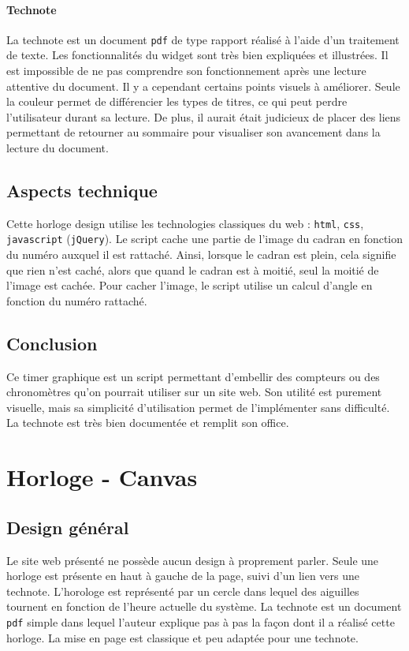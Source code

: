\documentclass[a4paper,11pt]{article}
\begin{document}
\paragraph{Technote}La technote est un document \texttt{pdf} de type rapport réalisé à l'aide d'un traitement de texte. Les fonctionnalités du widget sont très bien expliquées et illustrées. Il est impossible de ne pas comprendre son fonctionnement après une lecture attentive du document. Il y a cependant certains points visuels à améliorer. Seule la couleur permet de différencier les types de titres, ce qui peut perdre l'utilisateur durant sa lecture. De plus, il aurait était judicieux de placer des liens permettant de retourner au sommaire pour visualiser son avancement dans la lecture du document.
\subsection{Aspects technique}
Cette horloge design utilise les technologies classiques du web : \texttt{html}, \texttt{css}, \texttt{javascript} (\texttt{jQuery}). Le script cache une partie de l'image du cadran en fonction du numéro auxquel il est rattaché. Ainsi, lorsque le cadran est plein, cela signifie que rien n'est caché, alors que quand le cadran est à moitié, seul la moitié de l'image est cachée. Pour cacher l'image, le script utilise un calcul d'angle en fonction du numéro rattaché.
\subsection{Conclusion}
Ce timer graphique est un script permettant d'embellir des compteurs ou des chronomètres qu'on pourrait utiliser sur un site web. Son utilité est purement visuelle, mais sa simplicité d'utilisation permet de l'implémenter sans difficulté. La technote est très bien documentée et remplit son office.

\newpage

\section{Horloge - Canvas}
\subsection{Design général}
Le site web présenté ne possède aucun design à proprement parler. Seule une horloge est présente en haut à gauche de la page, suivi d'un lien vers une technote. L'horologe est représenté par un cercle dans lequel des aiguilles tournent en fonction de l'heure actuelle du système. La technote est un document \texttt{pdf} simple dans lequel l'auteur explique pas à pas la façon dont il a réalisé cette horloge. La mise en page est classique et peu adaptée pour une technote.
\end{document}
